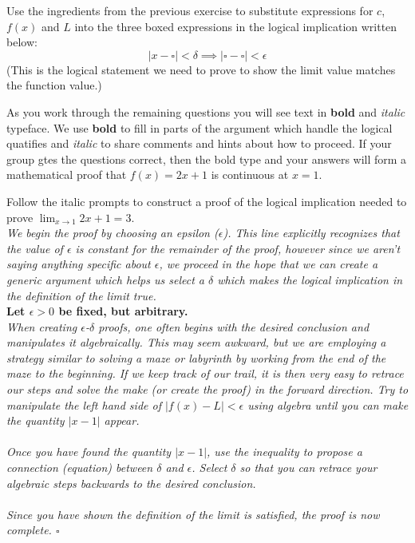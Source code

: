 \documentclass{ximera}
\begin{document}
\begin{exercise}
    Use the ingredients from the previous exercise to substitute expressions for $c$, $f(x)$ and $L$ into the three boxed expressions in the logical implication written below:
    \[|x-\square|<\delta \implies |\square-\square|<\epsilon \]
    (This is the logical statement we need to prove to show the limit value matches the function value.)
\end{exercise}


As you work through the remaining questions you will see text in \textbf{bold} and \textit{italic} typeface.  We use \textbf{bold} to fill in parts of the argument which handle the logical quatifies and \textit{italic} to share comments and hints about how to proceed.  If your group gtes the questions correct, then the bold type and your answers will form a mathematical proof that $f(x)=2x+1$ is continuous at $x=1$.

\begin{exercise}
    Follow the italic prompts to construct a proof of the logical implication needed to prove $\lim_{x\rightarrow 1}2x+1=3$.\\

    \textit{We begin the proof by choosing an epsilon ($\epsilon$).  This line explicitly recognizes that the value of $\epsilon$ is constant for the remainder of the proof, however since we aren't saying anything specific about $\epsilon$, we proceed in the hope that we can create a generic argument which helps us select a $\delta$ which makes the logical implication in the definition of the limit true.}\\
    \textbf{Let $\epsilon>0$ be fixed, but arbitrary.}\\
    \textit{When creating $\epsilon$-$\delta$ proofs, one often begins with the desired conclusion and manipulates it algebraically.  This may seem awkward, but we are employing a strategy similar to solving a maze or labyrinth by working from the end of the maze to the beginning.  If we keep track of our trail, it is then very easy to retrace our steps and solve the make (or create the proof) in the forward direction.  Try to manipulate the left hand side of $|f(x)-L|<\epsilon$ using algebra until you can make the quantity $|x-1|$ appear.}\\
    \\
    \textit{Once you have found the quantity $|x-1|$, use the inequality to propose a connection (equation) between $\delta$ and $\epsilon$.  Select $\delta$ so that you can retrace your algebraic steps backwards to the desired conclusion.}\\
    \\
    \textit{Since you have shown the definition of the limit is satisfied, the proof is now complete. $\square$}
\end{exercise}
\end{document}
